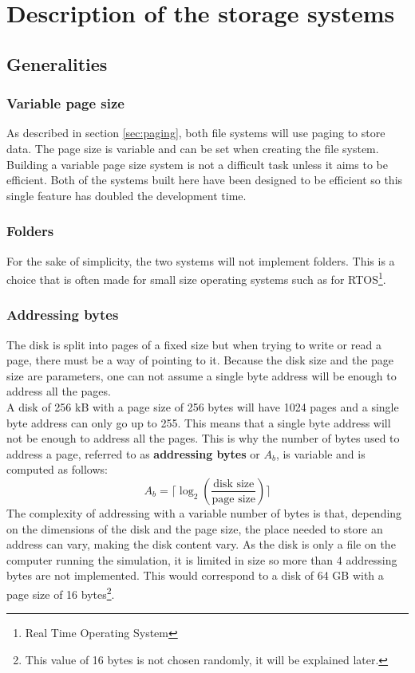 \documentclass[10pt,a4paper]{ULBreport}
\begin{document}
\chapter{Description of the storage systems}

\section{Generalities}
\subsection{Variable page size}
As described in section \ref{sec:paging}, both file systems will use paging to store data. The page size is variable and can be set when creating the file system. Building a variable page size system is not a difficult task unless it aims to be efficient. Both of the systems built here have been designed to be efficient so this single feature has doubled the development time.
\subsection{Folders}
For the sake of simplicity, the two systems will not implement folders. This is a choice that is often made for small size operating systems such as for RTOS\footnote{Real Time Operating System}.
\subsection{Addressing bytes}
The disk is split into pages of a fixed size but when trying to write or read a page, there must be a way of pointing to it. Because the disk size and the page size are parameters, one can not assume a single byte address will be enough to address all the pages. \\
A disk of 256 kB with a page size of 256 bytes will have 1024 pages and a single byte address can only go up to 255. This means that a single byte address will not be enough to address all the pages. This is why the number of bytes used to address a page, referred to as \textbf{addressing bytes} or $A_b$, is variable and is computed as follows:
\begin{equation*}
    A_b = \lceil \log_2\left(\frac{\text{disk size}}{\text{page size}}\right) \rceil
\end{equation*}
The complexity of addressing with a variable number of bytes is that, depending on the dimensions of the disk and the page size, the place needed to store an address can vary, making the disk content vary. As the disk is only a file on the computer running the simulation, it is limited in size so more than 4 addressing bytes are not implemented. This would correspond to a disk of 64 GB with a page size of 16 bytes\footnote{This value of 16 bytes is not chosen randomly, it will be explained later.}.
\end{document}
